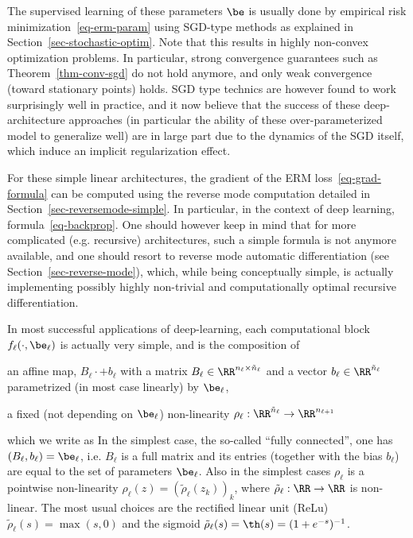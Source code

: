 The supervised learning of these parameters $\be$ is usually done by empirical risk minimization~\eqref{eq-erm-param} using SGD-type methods as explained in Section~\ref{sec-stochastic-optim}. Note that this results in highly non-convex optimization problems. In particular, strong convergence guarantees such as Theorem~\ref{thm-conv-sgd} do not hold anymore, and only weak convergence (toward stationary points) holds. SGD type technics are however found to work surprisingly well in practice, and it now believe that the success of these deep-architecture approaches (in particular the ability of these over-parameterized model to generalize well) are in large part due to the dynamics of the SGD itself, which induce an implicit regularization effect. 

For these simple linear architectures, the gradient of the ERM loss~\eqref{eq-grad-formula} can be computed using the reverse mode computation detailed in Section~\ref{sec-reversemode-simple}. In particular, in the context of deep learning, formula~\eqref{eq-backprop}. One should however keep in mind that for more complicated (e.g. recursive) architectures, such a simple formula is not anymore available, and one should resort to reverse mode automatic differentiation (see Section~\ref{sec-reverse-mode}), which, while being conceptually simple, is actually implementing possibly highly non-trivial and computationally optimal recursive differentiation. 

In most successful applications of deep-learning, each computational block $f_{\ell}(\cdot,\be_\ell)$ is actually very simple, and is the composition of 
\begin{rs}
	\item an affine map, $B_\ell \cdot + b_\ell$ with a matrix $B_\ell \in \RR^{n_\ell \times \tilde n_{\ell}}$ and a vector $b_\ell \in \RR^{\tilde n_\ell}$ parametrized (in most case linearly) by $\be_\ell$, 
	\item a fixed (not depending on $\be_\ell$) non-linearity $\rho_\ell : \RR^{\tilde n_{\ell}} \rightarrow \RR^{n_{\ell+1}}$
\end{rs}
which we write as
In the simplest case, the so-called ``fully connected'', one has $(B_\ell,b_\ell)=\be_\ell$, i.e. $B_\ell$ is a full matrix and its entries (together with the bias $b_\ell$) are equal to the set of parameters $\be_\ell$. 
%
Also in the simplest cases $\rho_\ell$ is a pointwise non-linearity $\rho_\ell(z)=(\tilde\rho_\ell(z_k))_k$, where $\tilde\rho_\ell : \RR \rightarrow \RR$ is non-linear. The most usual choices are the rectified linear unit (ReLu) $\tilde\rho_\ell(s)=\max(s,0)$ and the sigmoid $\tilde\rho_\ell(s)=\th(s) = (1+e^{-s})^{-1}$.

